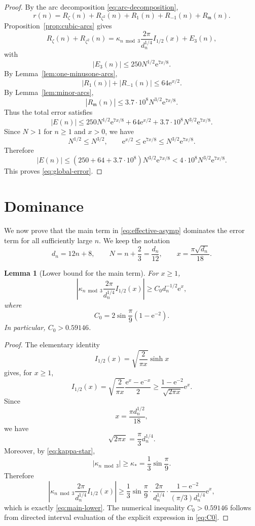\documentclass[11pt]{article}
\newtheorem{lemma}[theorem]{Lemma}
\theoremstyle{remark}
\newcommand{\e}{\mathrm e}
\newcommand{\mm}{\mathfrak m}
\begin{document}
\begin{proof}
By the arc decomposition \eqref{eq:arc-decomposition},
\[
r(n)
=
R_\zeta(n)+R_{\zeta^2}(n)
+
R_1(n)+R_{-1}(n)+R_{\mm}(n).
\]
Proposition~\ref{prop:cubic-arcs} gives
\[
R_\zeta(n)+R_{\zeta^2}(n)
=
\kappa_{n\bmod3}
\frac{2\pi}{d_n^{1/4}}I_{1/2}(x)
+
E_3(n),
\]
with
\[
|E_3(n)|\leq250N^{1/2}\e^{7x/8}.
\]
By Lemma~\ref{lem:one-minusone-arcs},
\[
|R_1(n)|+|R_{-1}(n)|
\leq64\e^{x/2}.
\]
By Lemma~\ref{lem:minor-arcs},
\[
|R_{\mm}(n)|
\leq
3.7\cdot10^8N^{3/2}\e^{7x/8}.
\]
Thus the total error satisfies
\[
|E(n)|
\leq
250N^{1/2}\e^{7x/8}
+
64\e^{x/2}
+
3.7\cdot10^8N^{3/2}\e^{7x/8}.
\]
Since $N>1$ for $n\geq1$ and $x>0$, we have
\[
N^{1/2}\leq N^{3/2},
\qquad
\e^{x/2}\leq \e^{7x/8}\leq N^{3/2}\e^{7x/8}.
\]
Therefore
\[
|E(n)|
\leq
\left(250+64+3.7\cdot10^8\right)
N^{3/2}\e^{7x/8}
<
4\cdot10^8N^{3/2}\e^{7x/8}.
\]
This proves \eqref{eq:global-error}.
\end{proof}


\section{Dominance}\label{sec:dominance}

We now prove that the main term in \eqref{eq:effective-asymp} dominates the
error term for all sufficiently large $n$.  We keep the notation
\[
d_n=12n+8,
\qquad
N=n+\frac23=\frac{d_n}{12},
\qquad
x=\frac{\pi\sqrt{d_n}}{18}.
\]

\begin{lemma}[Lower bound for the main term]\label{lem:main-lower}
For $x\geq1$,
\begin{equation}\label{eq:main-lower}
\left|\kappa_{n\bmod3}\frac{2\pi}{d_n^{1/4}}I_{1/2}(x)\right|
\geq C_0d_n^{-1/2}\e^x,
\end{equation}
where
\begin{equation}\label{eq:C0}
C_0=2\sin\frac\pi9(1-\e^{-2}).
\end{equation}
In particular, $C_0>0.59146$.
\end{lemma}

\begin{proof}
The elementary identity
\[
I_{1/2}(x)=\sqrt{\frac{2}{\pi x}}\sinh x
\]
gives, for $x\geq1$,
\[
I_{1/2}(x)
=\sqrt{\frac{2}{\pi x}}\frac{\e^x-\e^{-x}}{2}
\geq
\frac{1-\e^{-2}}{\sqrt{2\pi x}}\e^x.
\]
Since
\[
x=\frac{\pi d_n^{1/2}}{18},
\]
we have
\[
\sqrt{2\pi x}=\frac{\pi}{3}d_n^{1/4}.
\]
Moreover, by \eqref{eq:kappa-star},
\[
|\kappa_{n\bmod3}|\geq\kappa_*=\frac13\sin\frac\pi9.
\]
Therefore
\[
\left|\kappa_{n\bmod3}\frac{2\pi}{d_n^{1/4}}I_{1/2}(x)\right|
\geq
\frac13\sin\frac\pi9\cdot
\frac{2\pi}{d_n^{1/4}}\cdot
\frac{1-\e^{-2}}{(\pi/3)d_n^{1/4}}\e^x,
\]
which is exactly \eqref{eq:main-lower}.
The numerical inequality $C_0>0.59146$ follows from directed interval
evaluation of the explicit expression in \eqref{eq:C0}.
\end{proof}
\end{document}
